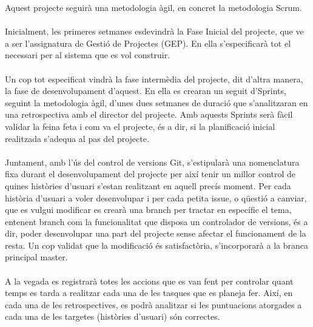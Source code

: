 Aquest projecte seguirà una metodologia àgil, en concret la metodologia Scrum.
\\\\
Inicialment, les primeres setmanes esdevindrà la Fase Inicial del projecte, que ve a ser l’assignatura de Gestió de Projectes (GEP). En ella s’especificarà tot el necessari per al sistema que es vol construir.
\\\\
Un cop tot especificat vindrà la fase intermèdia del projecte, dit d’altra manera, la fase de desenvolupament d’aquest. En ella es crearan un seguit d’Sprints, seguint la metodologia àgil, d’unes dues setmanes de duració que s’analitzaran en una retrospectiva amb el director del projecte. Amb aquests Sprints serà fàcil validar la feina feta i com va el projecte, és a dir, si la planificació inicial realitzada s’adequa al pas del projecte.
\\\\
Juntament, amb l’ús del control de versions Git, s’estipularà una nomenclatura fixa durant el desenvolupament del projecte per així tenir un millor control de quines històries d’usuari s’estan realitzant en aquell precís moment. Per cada història d’usuari a voler desenvolupar i per cada petita issue, o qüestió a canviar, que es vulgui modificar es crearà una branch per tractar en específic el tema, entenent branch com la funcionalitat que disposa un controlador de versions, és a dir, poder desenvolupar una part del projecte sense afectar el funcionament de la resta. Un cop validat que la modificació és satisfactòria, s’incorporarà a la branca principal master.
\\\\
A la vegada es registrarà totes les accions que es van fent per controlar quant temps es tarda a realitzar cada una de les tasques que es planeja fer. Així, en cada una de les retrospectives, es podrà analitzar si les puntuacions atorgades a cada una de les targetes (històries d’usuari) són correctes.